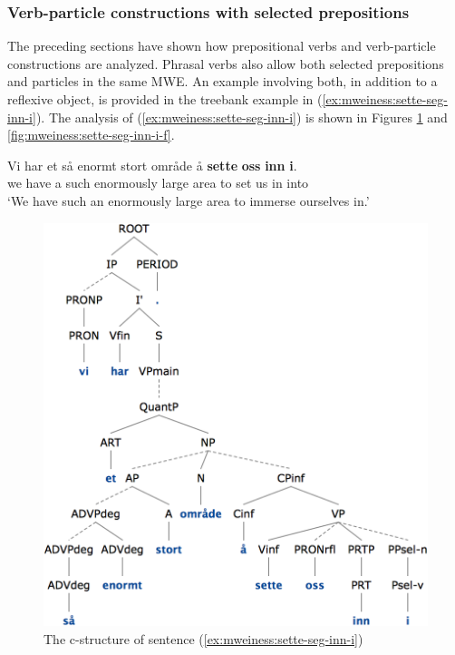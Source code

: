 \documentclass[output=paper]{langsci/langscibook}
\begin{document}
\subsubsection{Verb-particle constructions with selected prepositions}\label{sec:mweiness:prtprepverbs}

The preceding sections have shown how prepositional verbs and verb-particle constructions are analyzed.
Phrasal verbs also allow both selected prepositions and particles in the same MWE.
An example involving both, in addition to a reflexive object, is provided in the treebank example in (\ref{ex:mweiness:sette-seg-inn-i}).
The analysis of (\ref{ex:mweiness:sette-seg-inn-i}) is shown in Figures \ref{fig:mweiness:sette-seg-inn-i-c} and \ref{fig:mweiness:sette-seg-inn-i-f}.

\ea\label{ex:mweiness:sette-seg-inn-i}
\gll Vi har et så enormt stort område å \textbf{sette} \textbf{oss} \textbf{inn} \textbf{i}.\\
     we have a such enormously large area to set us in into\\
\glt `We have such an enormously large area to immerse ourselves in.'
\z

\begin{figure}
  \includegraphics[height=.47\textheight]{figures/sette-seg-inn-i-c.png}
  \caption{The c-structure of sentence (\ref{ex:mweiness:sette-seg-inn-i})}
  \label{fig:mweiness:sette-seg-inn-i-c}
\end{figure}
\end{document}

